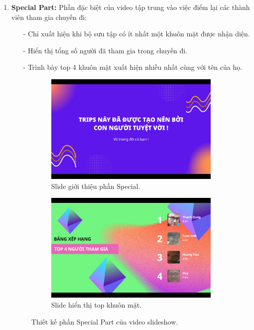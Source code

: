 \begin{enumerate}
    \item \textbf{Special Part:} Phần đặc biệt của video tập trung vào việc điểm lại các thành viên tham gia chuyến đi:
    \begin{itemize}
        \item[-] Chỉ xuất hiện khi bộ sưu tập có ít nhất một khuôn mặt được nhận diện.
        \item[-] Hiển thị tổng số người đã tham gia trong chuyến đi.
        \item[-] Trình bày top 4 khuôn mặt xuất hiện nhiều nhất cùng với tên của họ.
    \end{itemize}
    
    \begin{figure}[H]
        \centering
        \begin{subfigure}{0.48\textwidth}
            \includegraphics[width=1\linewidth]{figures/c4/4_1/special_1.jpg} 
            \caption{Slide giới thiệu phần Special.}
        \end{subfigure}
        \hfill
        \begin{subfigure}{0.48\textwidth}
            \includegraphics[width=1\linewidth]{figures/c4/4_1/special_2.jpg} 
            \caption{Slide hiển thị top khuôn mặt.}
        \end{subfigure}
        \caption{Thiết kế phần Special Part của video slideshow.}
        \label{fig:video-special-design}
    \end{figure}
    

\end{enumerate}
